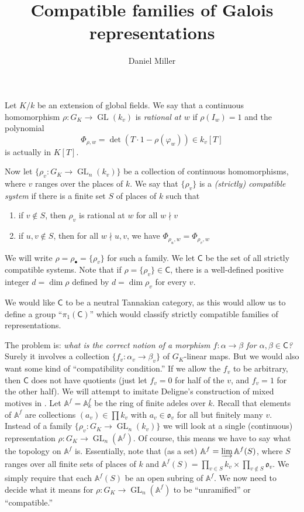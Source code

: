 \documentclass{article}
\title{Compatible families of Galois representations}
\author{Daniel Miller}
\DeclareMathOperator{\gl}{GL}
\newcommand{\dA}{\mathbb{A}}
\newcommand{\fo}{\mathfrak{o}}
\newcommand{\frob}{\varphi}
\newcommand{\scomp}{\mathsf{C}}
\begin{document}
\maketitle





Let $K/k$ be an extension of global fields. We say that a continuous 
homomorphism $\rho:G_K\to \gl(k_v)$ is \emph{rational at $w$} if $\rho(I_w)=1$ 
and the polynomial 
\[
  \Phi_{\rho,w} = \det(T\cdot 1-\rho(\frob_w)) \in k_v[T]
\]
is actually in $K[T]$. 

Now let $\{\rho_v:G_K\to \gl_n(k_v)\}$ be a collection of continuous 
homomorphisms, where $v$ ranges over the places of $k$. We say that 
$\{\rho_v\}$ is a \emph{(strictly) compatible system} if there is a finite set 
$S$ of places of $k$ such that 
\begin{enumerate}
  \item if $v\notin S$, then $\rho_v$ is rational at $w$ for all $w\nmid v$
  \item if $u,v\notin S$, then for all $w\nmid u,v$, we have 
    $\Phi_{\rho_u,w} = \Phi_{\rho_v,w}$
\end{enumerate}
We will write $\rho=\rho_\bullet=\{\rho_v\}$ for such a family. We let 
$\scomp$ be the set of all strictly compatible systems. Note that if 
$\rho=\{\rho_v\}\in\scomp$, there is a well-defined positive integer 
$d=\dim\rho$ defined by $d=\dim\rho_v$ for every $v$. 

We would like $\scomp$ to be a neutral Tannakian category, as this would 
allow us to define a group ``$\pi_1(\scomp)$'' which would classify strictly 
compatible families of representations. 

The problem is: \emph{what is the correct notion of a morphism 
$f:\alpha\to\beta$ for $\alpha,\beta\in\scomp$?} Surely it involves a 
collection $\{f_v:\alpha_v\to \beta_v\}$ of $G_K$-linear maps. But we would 
also want some kind of ``compatibility condition.'' If we allow the $f_v$ to 
be arbitrary, then $\scomp$ does not have quotients (just let $f_v=0$ for half 
of the $v$, and $f_v=1$ for the other half). We will attempt to imitate 
Deligne's construction of mixed motives in \cite[1.4]{De}. Let $\dA^f=\dA_k^f$ 
be the ring of finite adeles over $k$. Recall that elements of $\dA^f$ are 
collections $(a_v)\in \prod k_v$ with $a_v\in\fo_v$ for all but finitely many 
$v$. Instead of a family $\{\rho_v:G_K\to \gl_n(k_v)\}$ we will look at a 
single (continuous) representation $\rho:G_K\to \gl_n(\dA^f)$. Of course, this 
means we have to say what the topology on $\dA^f$ is. Essentially, note that 
(as a set) $\dA^f = \varinjlim \dA^f(S)$, where $S$ ranges over all finite 
sets of places of $k$ and 
$\dA^f(S)=\prod_{v\in S} k_v \times \prod_{v\notin S} \fo_v$. We simply 
require that each $\dA^f(S)$ be an open subring of $\dA^f$. We now need to 
decide what it means for $\rho:G_K\to\gl_n(\dA^f)$ to be ``unramified'' or 
``compatible.'' 
\end{document}
